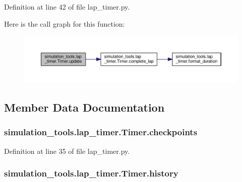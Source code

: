 Definition at line 42 of file lap\+\_\+timer.\+py.



Here is the call graph for this function\+:
\nopagebreak
\begin{figure}[H]
\begin{center}
\leavevmode
\includegraphics[width=350pt]{classsimulation__tools_1_1lap__timer_1_1_timer_ae9b21a99e315e66e34311c6b9feeb0e8_cgraph}
\end{center}
\end{figure}




\subsection{Member Data Documentation}
\subsubsection[{\texorpdfstring{checkpoints}{checkpoints}}]{\setlength{\rightskip}{0pt plus 5cm}simulation\+\_\+tools.\+lap\+\_\+timer.\+Timer.\+checkpoints}\hypertarget{classsimulation__tools_1_1lap__timer_1_1_timer_ae042ce601347d175584be16d8166a74e}{}\label{classsimulation__tools_1_1lap__timer_1_1_timer_ae042ce601347d175584be16d8166a74e}


Definition at line 35 of file lap\+\_\+timer.\+py.

\subsubsection[{\texorpdfstring{history}{history}}]{\setlength{\rightskip}{0pt plus 5cm}simulation\+\_\+tools.\+lap\+\_\+timer.\+Timer.\+history}\hypertarget{classsimulation__tools_1_1lap__timer_1_1_timer_a5f5e50dc374ab88c05748ab49392b881}{}\label{classsimulation__tools_1_1lap__timer_1_1_timer_a5f5e50dc374ab88c05748ab49392b881}


